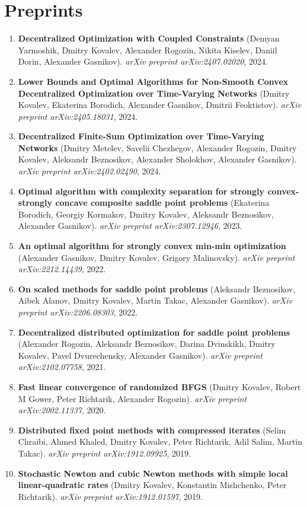 \section{Preprints}
\begin{enumerate}
\item
\textbf{Decentralized Optimization with Coupled Constraints} (Demyan Yarmoshik, Dmitry Kovalev, Alexander Rogozin, Nikita Kiselev, Daniil Dorin, Alexander Gasnikov). \textit{arXiv preprint arXiv:2407.02020}, 2024.
\item
\textbf{Lower Bounds and Optimal Algorithms for Non-Smooth Convex Decentralized Optimization over Time-Varying Networks} (Dmitry Kovalev, Ekaterina Borodich, Alexander Gasnikov, Dmitrii Feoktistov). \textit{arXiv preprint arXiv:2405.18031}, 2024.
\item
\textbf{Decentralized Finite-Sum Optimization over Time-Varying Networks} (Dmitry Metelev, Savelii Chezhegov, Alexander Rogozin, Dmitry Kovalev, Aleksandr Beznosikov, Alexander Sholokhov, Alexander Gasnikov). \textit{arXiv preprint arXiv:2402.02490}, 2024.
\item
\textbf{Optimal algorithm with complexity separation for strongly convex-strongly concave composite saddle point problems} (Ekaterina Borodich, Georgiy Kormakov, Dmitry Kovalev, Aleksandr Beznosikov, Alexander Gasnikov). \textit{arXiv preprint arXiv:2307.12946}, 2023.
\item
\textbf{An optimal algorithm for strongly convex min-min optimization} (Alexander Gasnikov, Dmitry Kovalev, Grigory Malinovsky). \textit{arXiv preprint arXiv:2212.14439}, 2022.
\item
\textbf{On scaled methods for saddle point problems} (Aleksandr Beznosikov, Aibek Alanov, Dmitry Kovalev, Martin Takac, Alexander Gasnikov). \textit{arXiv preprint arXiv:2206.08303}, 2022.
\item
\textbf{Decentralized distributed optimization for saddle point problems} (Alexander Rogozin, Aleksandr Beznosikov, Darina Dvinskikh, Dmitry Kovalev, Pavel Dvurechensky, Alexander Gasnikov). \textit{arXiv preprint arXiv:2102.07758}, 2021.
\item
\textbf{Fast linear convergence of randomized BFGS} (Dmitry Kovalev, Robert M Gower, Peter Richtarik, Alexander Rogozin). \textit{arXiv preprint arXiv:2002.11337}, 2020.
\item
\textbf{Distributed fixed point methods with compressed iterates} (Selim Chraibi, Ahmed Khaled, Dmitry Kovalev, Peter Richtarik, Adil Salim, Martin Takac). \textit{arXiv preprint arXiv:1912.09925}, 2019.
\item
\textbf{Stochastic Newton and cubic Newton methods with simple local linear-quadratic rates} (Dmitry Kovalev, Konstantin Mishchenko, Peter Richtarik). \textit{arXiv preprint arXiv:1912.01597}, 2019.
\end{enumerate}
